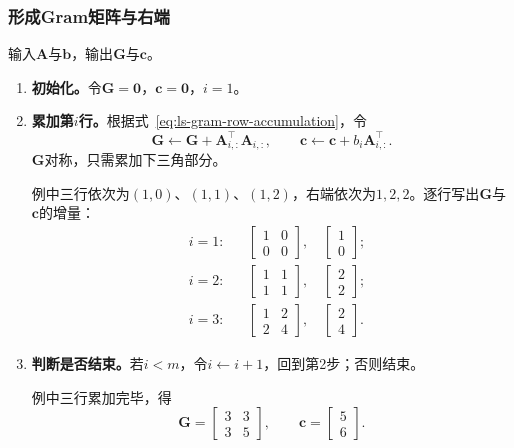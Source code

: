 \subsubsection{形成Gram矩阵与右端}
输入$\bm A$与$\bm b$，输出$\bm G$与$\bm c$。
\begin{enumerate}
 \item \textbf{初始化。}令$\bm G=\bm0$，$\bm c=\bm0$，$i=1$。

 \item \textbf{累加第$i$行。}根据式~\eqref{eq:ls-gram-row-accumulation}，令
 \[
  \bm G\leftarrow\bm G+\bm A_{i,:}^\top\bm A_{i,:},\qquad
  \bm c\leftarrow\bm c+b_i\bm A_{i,:}^\top .
 \]
 $\bm G$对称，只需累加下三角部分。
 
 例中三行依次为$(1,0)$、$(1,1)$、$(1,2)$，右端依次为$1,2,2$。逐行写出$\bm G$与$\bm c$的增量：
 \[
  \begin{aligned}
  &i=1:&&\begin{bmatrix}1&0\\0&0\end{bmatrix},\quad\begin{bmatrix}1\\0\end{bmatrix};\\
  &i=2:&&\begin{bmatrix}1&1\\1&1\end{bmatrix},\quad\begin{bmatrix}2\\2\end{bmatrix};\\
  &i=3:&&\begin{bmatrix}1&2\\2&4\end{bmatrix},\quad\begin{bmatrix}2\\4\end{bmatrix}.
  \end{aligned}
 \]

 \item \textbf{判断是否结束。}若$i<m$，令$i\leftarrow i+1$，回到第2步；否则结束。
 
 例中三行累加完毕，得
 \[
  \bm G=\begin{bmatrix}3&3\\3&5\end{bmatrix},\qquad
  \bm c=\begin{bmatrix}5\\6\end{bmatrix}.
 \]
\end{enumerate}

